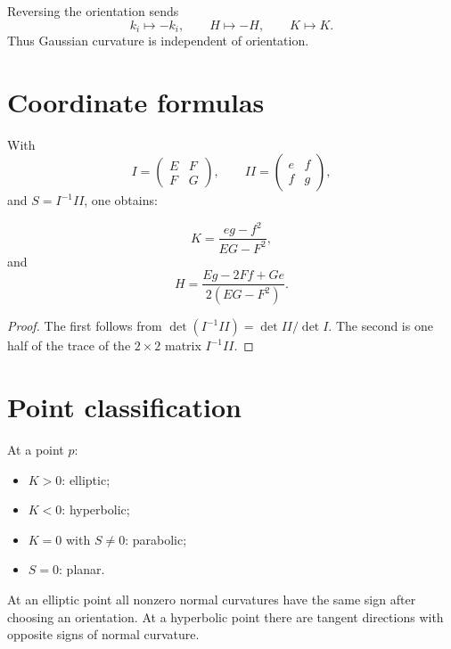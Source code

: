 \begin{proposition}\label{prop:vii17-orientation}
Reversing the orientation sends
\[
k_i\mapsto-k_i,\qquad H\mapsto-H,\qquad K\mapsto K.
\]
Thus Gaussian curvature is independent of orientation.
\end{proposition}

\section{Coordinate formulas}

With
\[
I=\begin{pmatrix}E&F\\F&G\end{pmatrix},
\qquad
II=\begin{pmatrix}e&f\\f&g\end{pmatrix},
\]
and \(S=I^{-1}II\), one obtains:

\begin{theorem}\label{thm:vii17-formulas}
\[
K=\frac{eg-f^2}{EG-F^2},
\]
and
\[
H=\frac{Eg-2Ff+Ge}{2(EG-F^2)}.
\]
\end{theorem}

\begin{proof}
The first follows from \(\det(I^{-1}II)=\det II/\det I\). The second is one half of the trace of the \(2\times2\) matrix \(I^{-1}II\).
\end{proof}

\section{Point classification}

\begin{definition}\label{def:vii17-point-types}
At a point \(p\):
\begin{itemize}
\item \(K>0\): elliptic;
\item \(K<0\): hyperbolic;
\item \(K=0\) with \(S\neq0\): parabolic;
\item \(S=0\): planar.
\end{itemize}
\end{definition}

\begin{proposition}\label{prop:vii17-signs}
At an elliptic point all nonzero normal curvatures have the same sign after choosing an orientation. At a hyperbolic point there are tangent directions with opposite signs of normal curvature.
\end{proposition}

